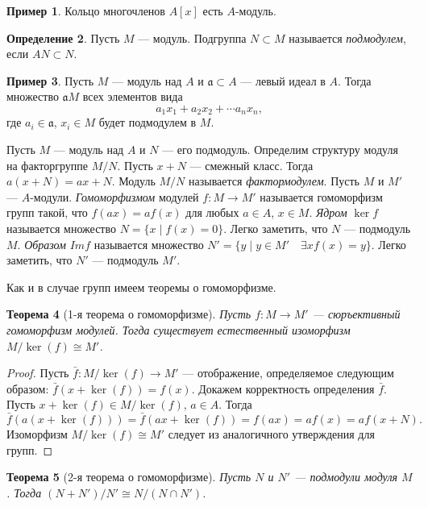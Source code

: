 \documentclass[12pt, titlepage, oneside]{amsbook}
\newcommand{\aaa}{\mathfrak{a}}
\newtheorem{theorem}{Теорема}[chapter]
\theoremstyle{definition}
\newtheorem{example}[theorem]{Пример}
\newtheorem{definition}[theorem]{Определение}
\theoremstyle{remark}
\begin{document}
\begin{example}
	Кольцо многочленов $A[x]$ есть $A$-модуль.
\end{example}

\begin{definition}
	Пусть $M$ --- модуль. Подгруппа $N\subset M$ называется \emph{подмодулем}, если $AN\subset N$.
\end{definition}

\begin{example}
	Пусть $M$ --- модуль над $A$ и $\aaa\subset A$ --- левый идеал в $A$. Тогда множество $\aaa M$ всех элементов вида $$a_1x_1+a_2x_2+\cdots a_nx_n,$$ где $a_i\in\aaa$, $x_i\in M$ будет подмодулем в $M$.
\end{example}

Пусть $M$ --- модуль над $A$ и $N$ --- его подмодуль. Определим структуру модуля на факторгруппе $M/N$. Пусть $x+N$ --- смежный класс. Тогда $a(x+N)=ax+N$. Модуль $M/N$ называется \emph{фактормодулем}. Пусть $M$ и $M'$ --- $A$-модули. \emph{Гомоморфизмом} модулей $f\colon M\rightarrow M'$ называется гомоморфизм групп такой, что $f(ax)=af(x)$ для любых $a\in A$, $x\in M$. \emph{Ядром} $\ker f$ называется множество $N=\{x\mid f(x)=0\}$. Легко заметить, что $N$ --- подмодуль $M$. \emph{Образом} $Im f$ называется множество $N'=\{y\mid y\in M'\quad\exists x f(x)=y\}$. Легко заметить, что $N'$ --- подмодуль $M'$.

Как и в случае групп имеем теоремы о гомоморфизме.

\begin{theorem}[1-я теорема о гомоморфизме]
	\label{Gommod1} Пусть $f\colon M\rightarrow M'$ --- сюръективный
	гомоморфизм модулей. Тогда существует естественный изоморфизм
	$M/\ker(f)\cong M'$.
\end{theorem}

\begin{proof}
	Пусть $\bar{f}\colon M/\ker(f)\rightarrow M'$ --- отображение,
	определяемое следующим образом: $\bar{f}(x+\ker(f))=f(x)$. Докажем
	корректность определения $\bar{f}$. Пусть $x+\ker(f)\in M/\ker(f)$, $a\in A$. Тогда $$\bar{f}(a(x+\ker(f)))=\bar{f}(ax+\ker(f))=f(ax)=af(x)=af(x+N).$$ Изоморфизм $M/\ker(f)\cong M'$ следует из аналогичного утверждения для групп.
\end{proof}

\begin{theorem}[2-я теорема о гомоморфизме]
	\label{Gommod2} Пусть $N$ и $N'$ --- подмодули модуля $M$. Тогда $(N+N')/N'\cong N/(N\cap N')$.
\end{theorem}
\end{document}
